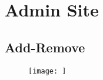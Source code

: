 \chapter{Admin Site}
\section{Add-Remove}\label{app:addremove}
\begin{figure}[h]
	\centering
	\texttt{[image: ]}
\end{figure}

